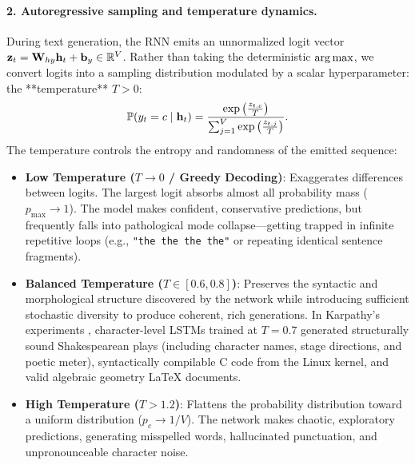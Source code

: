 \documentclass[../../main.tex]{subfiles}
\begin{document}
\paragraph{2. Autoregressive sampling and temperature dynamics.}
During text generation, the RNN emits an unnormalized logit vector $\mathbf{z}_t = \mathbf{W}_{hy} \mathbf{h}_t + \mathbf{b}_y \in \mathbb{R}^V$. Rather than taking the deterministic $\operatorname*{\mathrm{arg\,max}}$, we convert logits into a sampling distribution modulated by a scalar hyperparameter: the **temperature** $T > 0$:
\begin{equation}
\label{eq:temperature_sampling}
\mathbb{P}(y_t = c \mid \mathbf{h}_t) = \frac{\exp\left( \frac{z_{t, c}}{T} \right)}{\sum_{j=1}^V \exp\left( \frac{z_{t, j}}{T} \right)}.
\end{equation}
The temperature controls the entropy and randomness of the emitted sequence:
\begin{itemize}
    \item \textbf{Low Temperature ($T \to 0$ / Greedy Decoding)}: Exaggerates differences between logits. The largest logit absorbs almost all probability mass ($p_{\max} \to 1$). The model makes confident, conservative predictions, but frequently falls into pathological mode collapse—getting trapped in infinite repetitive loops (e.g., \texttt{"the the the the"} or repeating identical sentence fragments).
    \item \textbf{Balanced Temperature ($T \in [0.6, 0.8]$)}: Preserves the syntactic and morphological structure discovered by the network while introducing sufficient stochastic diversity to produce coherent, rich generations. In Karpathy's experiments \cite{karpathy2015rnn}, character-level LSTMs trained at $T=0.7$ generated structurally sound Shakespearean plays (including character names, stage directions, and poetic meter), syntactically compilable C code from the Linux kernel, and valid algebraic geometry LaTeX documents.
    \item \textbf{High Temperature ($T > 1.2$)}: Flattens the probability distribution toward a uniform distribution ($p_c \to 1/V$). The network makes chaotic, exploratory predictions, generating misspelled words, hallucinated punctuation, and unpronounceable character noise.
\end{itemize}
\end{document}

